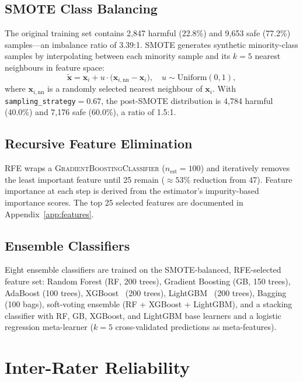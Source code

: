\documentclass[10pt,letterpaper]{article}
\begin{document}
\subsection{SMOTE Class Balancing}

The original training set contains 2,847 harmful (22.8\%) and 9,653 safe
(77.2\%) samples---an imbalance ratio of 3.39:1.  SMOTE generates synthetic
minority-class samples by interpolating between each minority sample and its
$k=5$ nearest neighbours in feature space:
\begin{equation}
  \tilde{\mathbf{x}} = \mathbf{x}_i +
    u \cdot \bigl(\mathbf{x}_{i,\mathrm{nn}} - \mathbf{x}_i\bigr),
  \quad u \sim \mathrm{Uniform}(0,1),
  \label{eq:smote}
\end{equation}
where $\mathbf{x}_{i,\mathrm{nn}}$ is a randomly selected nearest neighbour
of $\mathbf{x}_i$.  With \texttt{sampling\_strategy}$=0.67$, the post-SMOTE
distribution is 4,784 harmful (40.0\%) and 7,176 safe (60.0\%), a ratio of
1.5:1.

\subsection{Recursive Feature Elimination}

RFE wraps a \textsc{GradientBoostingClassifier} ($n_\mathrm{est}=100$) and
iteratively removes the least important feature until 25 remain
(${\approx}53\%$ reduction from 47).  Feature importance at each step is
derived from the estimator's impurity-based importance scores.  The top 25
selected features are documented in Appendix~\ref{app:features}.

\subsection{Ensemble Classifiers}

Eight ensemble classifiers are trained on the SMOTE-balanced, RFE-selected
feature set: Random Forest (RF, 200 trees), Gradient Boosting (GB, 150 trees),
AdaBoost (100 trees), XGBoost~\citep{chen2016xgboost} (200 trees),
LightGBM~\citep{ke2017lightgbm} (200 trees), Bagging (100 bags), soft-voting
ensemble (RF + XGBoost + LightGBM), and a stacking classifier with RF, GB,
XGBoost, and LightGBM base learners and a logistic regression meta-learner
($k=5$ cross-validated predictions as meta-features).

\section{Inter-Rater Reliability}
\label{sec:irr}
\end{document}
